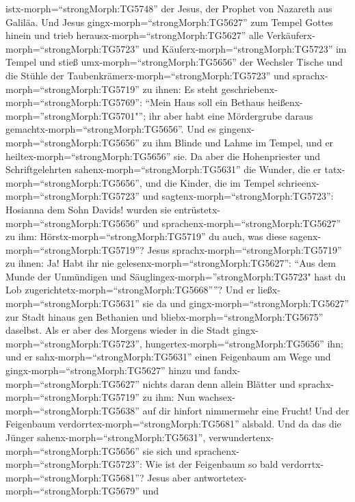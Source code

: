 istx-morph=``strongMorph:TG5748'' der Jesus, der Prophet von Nazareth
aus Galiläa.  Und Jesus gingx-morph=``strongMorph:TG5627''
zum Tempel Gottes hinein und trieb herausx-morph=``strongMorph:TG5627''
alle Verkäuferx-morph=``strongMorph:TG5723'' und
Käuferx-morph=``strongMorph:TG5723'' im Tempel und stieß
umx-morph=``strongMorph:TG5656'' der Wechsler Tische und die Stühle der
Taubenkrämerx-morph=``strongMorph:TG5723''  und
sprachx-morph=``strongMorph:TG5719'' zu ihnen: Es steht
geschriebenx-morph=``strongMorph:TG5769'': ``Mein Haus soll ein Bethaus
heißenx-morph=''strongMorph:TG5701"''; ihr aber habt eine Mördergrube
daraus gemachtx-morph=``strongMorph:TG5656''.  Und es
gingenx-morph=``strongMorph:TG5656'' zu ihm Blinde und Lahme im Tempel,
und er heiltex-morph=``strongMorph:TG5656'' sie.  Da aber
die Hohenpriester und Schriftgelehrten
sahenx-morph=``strongMorph:TG5631'' die Wunder, die er
tatx-morph=``strongMorph:TG5656'', und die Kinder, die im Tempel
schrieenx-morph=``strongMorph:TG5723'' und
sagtenx-morph=``strongMorph:TG5723'': Hosianna dem Sohn Davids! wurden
sie entrüstetx-morph=``strongMorph:TG5656''  und
sprachenx-morph=``strongMorph:TG5627'' zu ihm:
Hörstx-morph=``strongMorph:TG5719'' du auch, was diese
sagenx-morph=``strongMorph:TG5719''? Jesus
sprachx-morph=``strongMorph:TG5719'' zu ihnen: Ja! Habt ihr nie
gelesenx-morph=``strongMorph:TG5627'': ``Aus dem Munde der Unmündigen
und Säuglingex-morph=''strongMorph:TG5723" hast du Lob
zugerichtetx-morph=``strongMorph:TG5668''''?  Und er
ließx-morph=``strongMorph:TG5631'' sie da und
gingx-morph=``strongMorph:TG5627'' zur Stadt hinaus gen Bethanien und
bliebx-morph=``strongMorph:TG5675'' daselbst.  Als er aber
des Morgens wieder in die Stadt gingx-morph=``strongMorph:TG5723'',
hungertex-morph=``strongMorph:TG5656'' ihn;  und er
sahx-morph=``strongMorph:TG5631'' einen Feigenbaum am Wege und
gingx-morph=``strongMorph:TG5627'' hinzu und
fandx-morph=``strongMorph:TG5627'' nichts daran denn allein Blätter und
sprachx-morph=``strongMorph:TG5719'' zu ihm: Nun
wachsex-morph=``strongMorph:TG5638'' auf dir hinfort nimmermehr eine
Frucht! Und der Feigenbaum verdorrtex-morph=``strongMorph:TG5681''
alsbald.  Und da das die Jünger
sahenx-morph=``strongMorph:TG5631'',
verwundertenx-morph=``strongMorph:TG5656'' sie sich und
sprachenx-morph=``strongMorph:TG5723'': Wie ist der Feigenbaum so bald
verdorrtx-morph=``strongMorph:TG5681''?  Jesus aber
antwortetex-morph=``strongMorph:TG5679'' und
